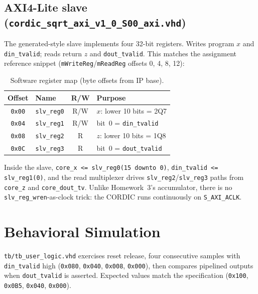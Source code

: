 \documentclass[11pt,letterpaper]{article}
\begin{document}
\subsection{AXI4-Lite slave (\texttt{cordic\_sqrt\_axi\_v1\_0\_S00\_axi.vhd})}

The generated-style slave implements four 32-bit registers. Writes program \(x\)
and \texttt{din\_tvalid}; reads return \(z\) and \texttt{dout\_tvalid}. This
matches the assignment reference snippet (\texttt{mWriteReg}/\texttt{mReadReg}
offsets 0, 4, 8, 12):

\begin{table}[H]
    \centering
    \caption{Software register map (byte offsets from IP base).}
    \label{tab:regs}
    \small
    \begin{tabular}{clcp{7cm}}
        \toprule
        \textbf{Offset} & \textbf{Name} & \textbf{R/W} & \textbf{Purpose} \\
        \midrule
        \texttt{0x00} & \texttt{slv\_reg0} & R/W & \(x\): lower 10 bits = 2Q7 \\
        \texttt{0x04} & \texttt{slv\_reg1} & R/W & bit~0 = \texttt{din\_tvalid} \\
        \texttt{0x08} & \texttt{slv\_reg2} & R   & \(z\): lower 10 bits = 1Q8 \\
        \texttt{0x0C} & \texttt{slv\_reg3} & R   & bit~0 = \texttt{dout\_tvalid} \\
        \bottomrule
    \end{tabular}
\end{table}

Inside the slave, \texttt{core\_x <= slv\_reg0(15 downto 0)},
\texttt{din\_tvalid <= slv\_reg1(0)}, and the read multiplexer drives
\texttt{slv\_reg2}/\texttt{slv\_reg3} paths from \texttt{core\_z} and
\texttt{core\_dout\_tv}. Unlike Homework~3's accumulator, there is no
\texttt{slv\_reg\_wren}-as-clock trick: the CORDIC runs continuously on
\texttt{S\_AXI\_ACLK}.

\section{Behavioral Simulation}

\texttt{tb/tb\_user\_logic.vhd} exercises reset release, four consecutive samples
with \texttt{din\_tvalid} high (\texttt{0x080}, \texttt{0x040}, \texttt{0x008},
\texttt{0x000}), then compares pipelined outputs when \texttt{dout\_tvalid} is
asserted. Expected values match the specification (\texttt{0x100},
\texttt{0x0B5}, \texttt{0x040}, \texttt{0x000}).
\end{document}
